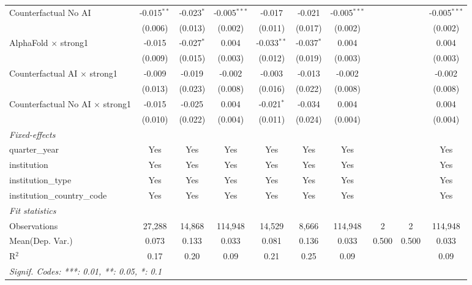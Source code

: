 \begin{tabular}{lccccccccc}
   Counterfactual No AI                   & -0.015$^{**}$ & -0.023$^{*}$ & -0.005$^{***}$ & -0.017        & -0.021       & -0.005$^{***}$ &     &     & -0.005$^{***}$\\   
                                          & (0.006)       & (0.013)      & (0.002)        & (0.011)       & (0.017)      & (0.002)        &     &     & (0.002)\\   
   AlphaFold $\times$ strong1             & -0.015        & -0.027$^{*}$ & 0.004          & -0.033$^{**}$ & -0.037$^{*}$ & 0.004          &     &     & 0.004\\   
                                          & (0.009)       & (0.015)      & (0.003)        & (0.012)       & (0.019)      & (0.003)        &     &     & (0.003)\\   
   Counterfactual AI $\times$ strong1     & -0.009        & -0.019       & -0.002         & -0.003        & -0.013       & -0.002         &     &     & -0.002\\   
                                          & (0.013)       & (0.023)      & (0.008)        & (0.016)       & (0.022)      & (0.008)        &     &     & (0.008)\\   
   Counterfactual No AI $\times$ strong1  & -0.015        & -0.025       & 0.004          & -0.021$^{*}$  & -0.034       & 0.004          &     &     & 0.004\\   
                                          & (0.010)       & (0.022)      & (0.004)        & (0.011)       & (0.024)      & (0.004)        &     &     & (0.004)\\   
   \midrule
   \emph{Fixed-effects}\\
   quarter\_year                          & Yes           & Yes          & Yes            & Yes           & Yes          & Yes            &     &     & Yes\\  
   institution                            & Yes           & Yes          & Yes            & Yes           & Yes          & Yes            &     &     & Yes\\  
   institution\_type                      & Yes           & Yes          & Yes            & Yes           & Yes          & Yes            &     &     & Yes\\  
   institution\_country\_code             & Yes           & Yes          & Yes            & Yes           & Yes          & Yes            &     &     & Yes\\  
   \midrule
   \emph{Fit statistics}\\
   Observations                           & 27,288        & 14,868       & 114,948        & 14,529        & 8,666        & 114,948        & 2   & 2   & 114,948\\  
Mean(Dep. Var.) & 0.073 & 0.133 & 0.033 & 0.081 & 0.136 & 0.033 & 0.500 & 0.500 & 0.033 \\
   R$^2$                                  & 0.17          & 0.20         & 0.09           & 0.21          & 0.25         & 0.09           &     &     & 0.09\\  
   \midrule \midrule
   \multicolumn{10}{l}{\emph{Signif. Codes: ***: 0.01, **: 0.05, *: 0.1}}\\
\end{tabular}
\par\endgroup
